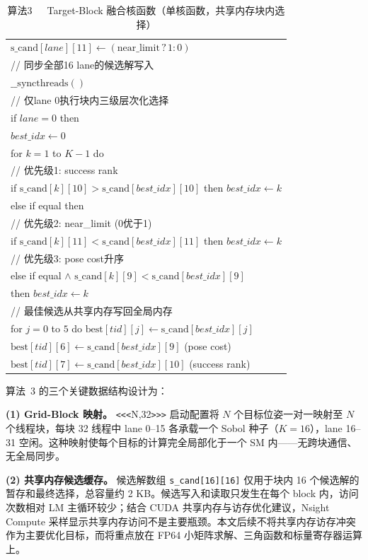 \documentclass[twocolumn,a4paper,10pt]{ctexart}
\makeatletter
\newenvironment{algotable}[2]{%
  \begin{table}[htbp]
  \centering
  \caption{#2}
  \label{#1}
  \footnotesize\ttfamily
  \begin{tabular}{@{}p{\columnwidth}@{}}
  \toprule
}{%
  \\\bottomrule
  \end{tabular}
  \end{table}
}
\makeatother
\begin{document}
\begin{algotable}{alg:kernel}{算法3~~~Target-Block 融合核函数（单核函数，共享内存块内选择）}
\qquad $\mathrm{s\_cand}[\textit{lane}][11]\leftarrow(\mathrm{near\_limit}\,?\,1:0)$\\
// 同步全部16 lane的候选解写入\\
\quad $\_\_\mathrm{syncthreads}()$\\
// 仅lane 0执行块内三级层次化选择\\
\quad if $\textit{lane}=0$ then\\
\qquad $\textit{best\_idx}\leftarrow0$\\
\qquad for $k=1$ to $K-1$ do\\
// 优先级1: success rank\\
\qquad\quad if $\mathrm{s\_cand}[k][10]>\mathrm{s\_cand}[\textit{best\_idx}][10]$ then $\textit{best\_idx}\leftarrow k$\\
\qquad\quad else if equal then\\
// 优先级2: near\_limit (0优于1)\\
\qquad\qquad if $\mathrm{s\_cand}[k][11]<\mathrm{s\_cand}[\textit{best\_idx}][11]$ then $\textit{best\_idx}\leftarrow k$\\
// 优先级3: pose cost升序\\
\qquad\qquad else if equal $\land$ $\mathrm{s\_cand}[k][9]<\mathrm{s\_cand}[\textit{best\_idx}][9]$\\
\qquad\qquad\quad then $\textit{best\_idx}\leftarrow k$\\
// 最佳候选从共享内存写回全局内存\\
\qquad for $j=0$ to $5$ do $\mathrm{best}[\textit{tid}][j]\leftarrow\mathrm{s\_cand}[\textit{best\_idx}][j]$\\
\qquad $\mathrm{best}[\textit{tid}][6]\leftarrow\mathrm{s\_cand}[\textit{best\_idx}][9]$ (pose cost)\\
\qquad $\mathrm{best}[\textit{tid}][7]\leftarrow\mathrm{s\_cand}[\textit{best\_idx}][10]$ (success rank)
\end{algotable}

算法~3 的三个关键数据结构设计为：

\textbf{(1) Grid-Block 映射。} \texttt{<<<}N,32\texttt{>>>} 启动配置将 $N$ 个目标位姿一对一映射至 $N$ 个线程块，每块 32 线程中 lane 0--15 各承载一个 Sobol 种子（$K=16$），lane 16--31 空闲。这种映射使每个目标的计算完全局部化于一个 SM 内——无跨块通信、无全局同步。

\textbf{(2) 共享内存候选缓存。} 候选解数组 \texttt{s\_cand[16][16]} 仅用于块内 16 个候选解的暂存和最终选择，总容量约 2 KB。候选写入和读取只发生在每个 block 内，访问次数相对 LM 主循环较少；结合 CUDA 共享内存与访存优化建议\cite{cuda-best-practices}，Nsight Compute 采样显示共享内存访问不是主要瓶颈。本文后续不将共享内存访存冲突作为主要优化目标，而将重点放在 FP64 小矩阵求解、三角函数和标量寄存器运算上。
\end{document}
